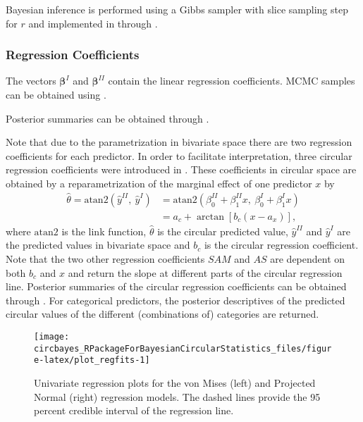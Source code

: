 Bayesian inference is performed using a Gibbs sampler with slice
sampling step for \(r\) \citep{hernandez2017general} and implemented in
 through .

\hypertarget{regression-coefficients}{%
\subsubsection{Regression Coefficients}\label{regression-coefficients}}

The vectors \(\boldsymbol{\beta}^{I}\) and \(\boldsymbol{\beta}^{II}\)
contain the linear regression coefficients. MCMC samples can be obtained
using .

Posterior summaries can be obtained through .

Note that due to the parametrization in bivariate space there are two
regression coefficients for each predictor. In order to facilitate
interpretation, three circular regression coefficients were introduced
in \citet{CremersMulderKlugkist2017}. These coefficients in circular
space are obtained by a reparametrization of the marginal effect of one
predictor \(x\) by \begin{align}
  \label{reparametrization_ch3}
  \hat{\theta} = \text{atan2}\left(\hat{y}^{II}, \:\hat{y}^{I}\right) &= \text{atan2}\left(\beta_{0}^{II} + \beta_{1}^{II} x, \: \beta_{0}^{I} + \beta_{1}^{I} x\right) \nonumber\\
  &= a_c + \arctan\left[b_{c}\left(x - a_{x}\right)\right],
\end{align} where \(\text{atan2}\) is the link function,
\(\hat{\theta}\) is the circular predicted value, \(\hat{y}^{II}\) and
\(\hat{y}^{I}\) are the predicted values in bivariate space and \(b_c\)
is the circular regression coefficient. Note that the two other
regression coefficients \(SAM\) and \(AS\) are dependent on both \(b_c\)
and \(x\) and return the slope at different parts of the circular
regression line. Posterior summaries of the circular regression
coefficients can be obtained through . For
categorical predictors, the posterior descriptives of the predicted
circular values of the different (combinations of) categories are
returned.

\begin{CodeChunk}
\begin{figure}

{\centering \texttt{[image: circbayes\_RPackageForBayesianCircularStatistics\_files/figure-latex/plot\_regfits-1]} 

}

\caption[Univariate regression plots for the von Mises (left) and Projected Normal (right) regression models]{Univariate regression plots for the von Mises (left) and Projected Normal (right) regression models. The dashed lines provide the 95 percent credible interval of the regression line.}\label{fig:plot_regfits}
\end{figure}
\end{CodeChunk}

